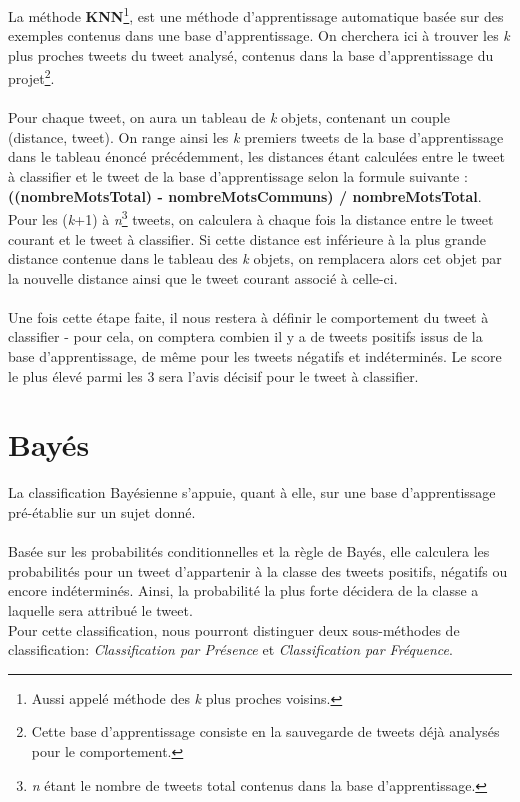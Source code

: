 \documentclass[pdftex,12pt,a4paper]{report}
\begin{document}
\begin{spacing}{1.2}
La méthode \textbf{KNN}\footnote{Aussi appelé méthode des \textit{k} plus proches voisins.}, est une méthode d'apprentissage automatique basée sur des exemples contenus dans une base d'apprentissage.
On cherchera ici à trouver les \textit{k} plus proches tweets du tweet analysé, contenus dans la base d'apprentissage du projet\footnote{Cette base d'apprentissage consiste en la sauvegarde de tweets déjà analysés pour le comportement.}.
\\
\\
Pour chaque tweet, on aura un tableau de \textit{k} objets, contenant un couple (distance, tweet). On range ainsi les \textit{k} premiers tweets de la base d'apprentissage dans le tableau énoncé précédemment, les distances étant calculées entre le tweet à classifier et le tweet de la base d'apprentissage selon la formule suivante : \textbf{((nombreMotsTotal) - nombreMotsCommuns) / nombreMotsTotal}.
\\Pour les (\textit{k}+1) à \textit{n}\footnote{\textit{n} étant le nombre de tweets total contenus dans la base d'apprentissage.} tweets, on calculera à chaque fois la distance entre le tweet courant et le tweet à classifier. Si cette distance est inférieure à la plus grande distance contenue dans le tableau des \textit{k} objets, on remplacera alors cet objet par la nouvelle distance ainsi que le tweet courant associé à celle-ci.
\\
\\
Une fois cette étape faite, il nous restera à définir le comportement du tweet à classifier - pour cela, on comptera combien il y a de tweets positifs issus de la base d'apprentissage, de même pour les tweets négatifs et indéterminés. Le score le plus élevé parmi les 3 sera l'avis décisif pour le tweet à classifier.

\section{Bayés}

La classification Bayésienne s'appuie, quant à elle, sur une base d'apprentissage pré-établie sur un sujet donné.\\\\ Basée sur les probabilités conditionnelles et la règle de Bayés, elle calculera les probabilités pour un tweet d'appartenir à la classe des tweets positifs, négatifs ou encore indéterminés. Ainsi, la probabilité la plus forte décidera de la classe a laquelle sera attribué le tweet.\\
Pour cette classification, nous pourront distinguer deux sous-méthodes de classification: \textit{Classification par Présence} et \textit{Classification par Fréquence}.


\end{spacing}
\end{document}
